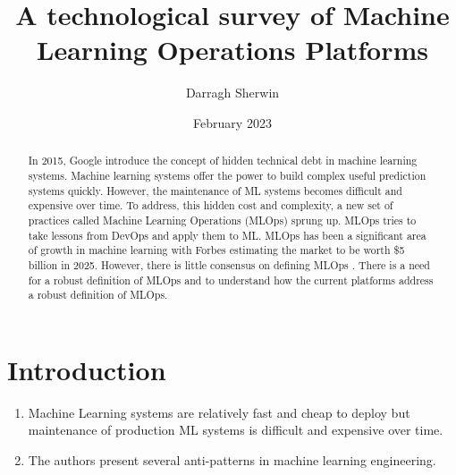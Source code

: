 \documentclass[12pt, a4paper]{article}
\title{A technological survey of Machine Learning Operations Platforms}
\author{Darragh Sherwin}
\date{February 2023}
\begin{document}
\maketitle
\begin{abstract}
In 2015, Google introduce the concept of hidden technical debt in machine learning systems\autocite{sculleyHiddenTechnicalDebt2015}. Machine learning systems offer the power to build complex useful prediction systems quickly. However, the maintenance of ML systems becomes difficult and expensive over time. To address, this hidden cost and complexity, a new set of practices called Machine Learning Operations (MLOps) sprung up. MLOps tries to take lessons from DevOps and apply them to ML. 
\linebreak
MLOps has been a significant area of growth in machine learning with Forbes estimating the market to be worth \$5 billion in 2025. However, there is little consensus on defining MLOps \autocite{mboweniSystematicReviewMachine2022}.
There is a need for a robust definition of MLOps and to understand how the current platforms address a robust definition of MLOps.


\end{abstract}

\section{Introduction}


\begin{enumerate}

\item Machine Learning systems are relatively fast and cheap to deploy but maintenance of production ML systems is difficult and expensive over time.  \autocite{sculleyHiddenTechnicalDebt2015}

\item The authors present several anti-patterns in machine learning engineering. \autocite{muralidharUsingAntiPatternsAvoid2021}

\end{enumerate}

\printbibliography
\end{document}
